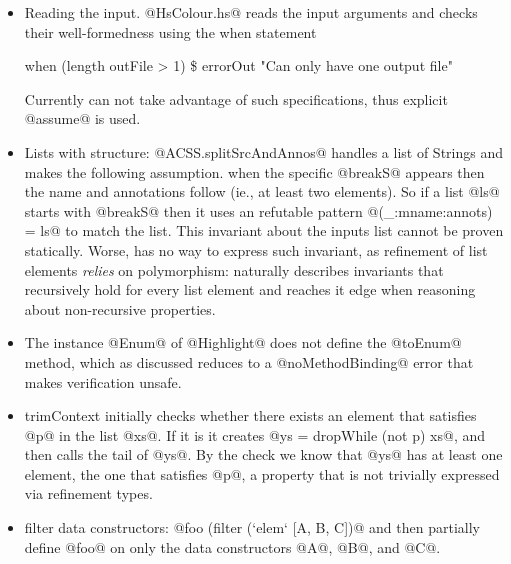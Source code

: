\begin{itemize}
\item Reading the input.
@HsColour.hs@ reads the input arguments and checks their well-formedness
using the when statement
%
\begin{code}
when (length outFile > 1) \$ errorOut "Can only have one output file"
\end{code}
%
Currently \toolname can not take advantage of such specifications, 
thus explicit @assume@ is used.

\item Lists with structure:
@ACSS.splitSrcAndAnnos@ handles a list of Strings and makes the following assumption.
when the specific @breakS@ appears then the name and annotations follow (ie., at least two elements).
So if a list @ls@ starts with @breakS@ then it uses an refutable pattern  @(_:mname:annots) = ls@
to match the list.
This invariant about the inputs list cannot be proven statically.
Worse, \toolname has no way to express such invariant, 
as refinement of list elements \textit{relies} on polymorphism: 
\toolname naturally describes invariants that recursively hold for every list element and 
reaches it edge when reasoning about non-recursive properties.

\item The instance @Enum@ of @Highlight@ does not define the @toEnum@ method, 
which as discussed reduces to a @noMethodBinding@ error that makes verification unsafe.

\item trimContext initially checks whether there exists an element that satisfies @p@ in the list @xs@.
If it is it creates @ys = dropWhile (not p) xs@, and then calls the tail of @ys@.
By the check we know that @ys@ has at least one element, the one that satisfies @p@, 
a property that is not trivially expressed via refinement types.


\item filter data constructors: @foo (filter (`elem` [A, B, C])@ and then partially define 
@foo@ on only the data constructors @A@, @B@, and @C@.
\end{itemize}
